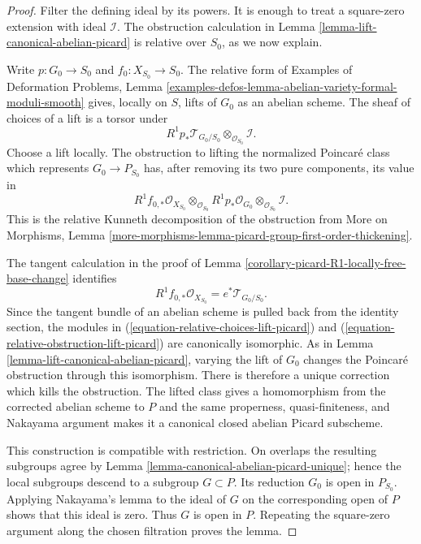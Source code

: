 \begin{proof}
Filter the defining ideal by its powers. It is enough to treat a square-zero
extension with ideal $\mathcal{I}$. The obstruction calculation in Lemma
\ref{lemma-lift-canonical-abelian-picard} is relative over $S_0$, as we now
explain.

Write $p : G_0 \to S_0$ and $f_0 : X_{S_0} \to S_0$. The relative form of
Examples of Deformation Problems, Lemma
\ref{examples-defos-lemma-abelian-variety-formal-moduli-smooth} gives, locally
on $S$, lifts of $G_0$ as an abelian scheme. The sheaf of choices of a lift is
a torsor under
\begin{equation}
\label{equation-relative-choices-lift-picard}
R^1p_*\mathcal{T}_{G_0/S_0}\otimes_{\mathcal{O}_{S_0}}\mathcal{I}.
\end{equation}
Choose a lift locally. The obstruction to lifting the normalized Poincar\'e
class which represents $G_0 \to P_{S_0}$ has, after removing its two pure
components, its value in
\begin{equation}
\label{equation-relative-obstruction-lift-picard}
R^1f_{0,*}\mathcal{O}_{X_{S_0}}
\otimes_{\mathcal{O}_{S_0}}
R^1p_*\mathcal{O}_{G_0}
\otimes_{\mathcal{O}_{S_0}}\mathcal{I}.
\end{equation}
This is the relative Kunneth decomposition of the obstruction from More on
Morphisms, Lemma
\ref{more-morphisms-lemma-picard-group-first-order-thickening}.

The tangent calculation in the proof of Lemma
\ref{corollary-picard-R1-locally-free-base-change} identifies
$$
R^1f_{0,*}\mathcal{O}_{X_{S_0}}
=e^*\mathcal{T}_{G_0/S_0}.
$$
Since the tangent bundle of an abelian scheme is pulled back from the identity
section, the modules in
(\ref{equation-relative-choices-lift-picard}) and
(\ref{equation-relative-obstruction-lift-picard}) are canonically isomorphic.
As in Lemma \ref{lemma-lift-canonical-abelian-picard}, varying the lift of
$G_0$ changes the Poincar\'e obstruction through this isomorphism. There is
therefore a unique correction which kills the obstruction. The lifted class
gives a homomorphism from the corrected abelian scheme to $P$ and the same
properness, quasi-finiteness, and Nakayama argument makes it a canonical
closed abelian Picard subscheme.

This construction is compatible with restriction. On overlaps the resulting
subgroups agree by Lemma \ref{lemma-canonical-abelian-picard-unique}; hence the
local subgroups descend to a subgroup $G \subset P$. Its reduction $G_0$ is
open in $P_{S_0}$. Applying Nakayama's lemma to the ideal of $G$ on the
corresponding open of $P$ shows that this ideal is zero. Thus $G$ is open in
$P$. Repeating the square-zero argument along the chosen filtration proves
the lemma.
\end{proof}

